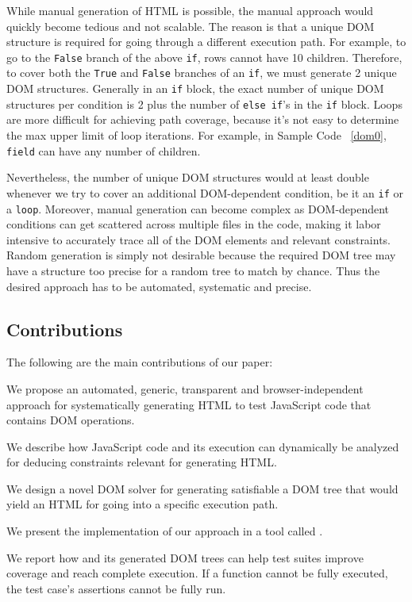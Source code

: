 While manual generation of HTML is possible, the manual approach would quickly become tedious and not scalable.  
The reason is that a unique DOM structure is required for going through a different execution path.
For example, to go to the {\tt False} branch of the above {\tt if}, rows cannot have 10 children.
Therefore, to cover both the {\tt True} and {\tt False} branches of an {\tt if}, we must generate 2 unique DOM structures.  
Generally in an {\tt if} block, the exact number of unique DOM structures per condition is 2 plus the number of {\tt else if}'s in the {\tt if} block.  
Loops are more difficult for achieving path coverage, because it's not easy to determine the max upper limit of loop iterations.  For example, in Sample Code ~\ref{dom0}, {\tt field} can have any number of children.

Nevertheless, the number of unique DOM structures would at least double whenever we try to cover an additional DOM-dependent condition, be it an {\tt if} or a {\tt loop}.  
Moreover, manual generation can become complex as DOM-dependent conditions can get scattered across multiple files in the code, making it labor intensive to accurately trace all of the DOM elements and relevant constraints.  
Random generation is simply not desirable because the required DOM tree may have a structure too precise for a random tree to match by chance.  
Thus the desired approach has to be automated, systematic and precise.


\subsection{Contributions}
The following are the main contributions of our paper:
\begin {compactitem}
\item We propose an automated, generic, transparent and browser-independent approach for systematically generating HTML to test JavaScript code that contains DOM operations.
\item We describe how JavaScript code and its execution can dynamically be analyzed for deducing constraints relevant for generating HTML.
\item We design a novel DOM solver for generating satisfiable a DOM tree that would yield an HTML for going into a specific execution path. 
\item We present the implementation of our approach in a tool called \tool.%
\item We report how \tool and its generated DOM trees can help test suites improve coverage and reach complete execution.  If a function cannot be fully executed, the test case's assertions cannot be fully run.  
\end {compactitem}

